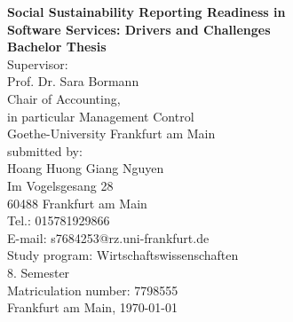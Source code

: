 \begin{titlepage}
    \begin{center}
        \vspace*{2cm}
        {\LARGE \textbf{Social Sustainability Reporting Readiness in \\[0.1cm] Software Services: Drivers and Challenges}}\\[1.7cm]
        {\Large \textbf{Bachelor Thesis}}\\[1.7cm]

        Supervisor:\\[0.5cm]
        Prof. Dr. Sara Bormann\\
        Chair of Accounting,\\
        in particular Management Control\\
        Goethe-University Frankfurt am Main\\[1.7cm]

        submitted by:\\[0.5cm]
        {Hoang Huong Giang Nguyen}\\
        {Im Vogelsgesang 28}\\
        {60488 Frankfurt am Main}\\
        Tel.: {015781929866}\\
        E-mail: {s7684253@rz.uni-frankfurt.de}\\
        Study program: {Wirtschaftswissenschaften}\\
        {8. Semester}\\
        Matriculation number: {7798555}\\[1.7cm]

        Frankfurt am Main, \today
    \end{center}
\end{titlepage}